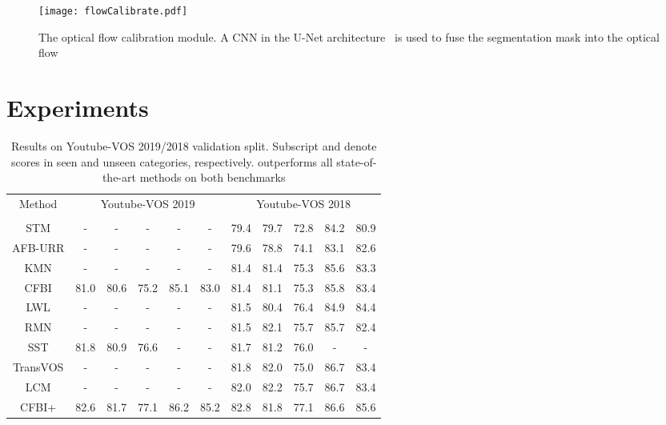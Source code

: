\documentclass[runningheads]{llncs}
\begin{document}
\begin{figure}[tp]
    \centering
    \texttt{[image: flowCalibrate.pdf]}
    \caption{The optical flow calibration module. A CNN in the U-Net architecture~\cite{ronneberger2015u} is used to fuse the segmentation mask into the optical flow}
    \label{fig:flowCalib}
\end{figure}

\section{Experiments}

\setlength{\tabcolsep}{4pt}
\begin{table}[t]
\begin{center}
\caption{Results on Youtube-VOS 2019/2018 validation split. Subscript  and  denote scores in seen and unseen categories, respectively. {\shortname} outperforms all state-of-the-art methods on both benchmarks}
\label{table:youtubevos}
\begin{tabular}{cccccc|ccccc}
\hline
\multirow{2}{4em}{Method} & \multicolumn{5}{c}{Youtube-VOS 2019} & \multicolumn{5}{c}{Youtube-VOS 2018} \\
&  &  &  &  &  &  &  &  &  & \\
\hline
STM\cite{STM} & - & - & - & - & - & 79.4 & 79.7 & 72.8 & 84.2 & 80.9\\
AFB-URR\cite{liang2020video} & - & - & - & - & - & 79.6 & 78.8 & 74.1 & 83.1 & 82.6\\
KMN\cite{seong2020kernelized} & - & - & - & - & - & 81.4 & 81.4 & 75.3 & 85.6 & 83.3\\
CFBI\cite{yang2020collaborative} & 81.0 & 80.6 & 75.2 & 85.1 & 83.0 & 81.4 & 81.1 & 75.3 & 85.8 & 83.4\\
LWL\cite{bhat2020learning} & - & - & - & - & - & 81.5 & 80.4 & 76.4 & 84.9 & 84.4\\
RMN\cite{RMNet} & - & - & - & - & - & 81.5 & 82.1 & 75.7 & 85.7 & 82.4\\
SST\cite{duke2021sstvos} & 81.8 & 80.9 & 76.6 & - & - & 81.7 & 81.2 & 76.0 & - & -\\
TransVOS\cite{TransVOS} & - & - & - & - & - & 81.8 & 82.0 & 75.0 & 86.7 & 83.4\\
LCM\cite{hu2021learning} & - & - & - & - & - & 82.0 & 82.2 & 75.7 & 86.7 & 83.4 \\
CFBI+\cite{yang2021collaborative} & 82.6 & 81.7 & 77.1 & 86.2 & 85.2 & 82.8 & 81.8 & 77.1 & 86.6 & 85.6\\

\end{tabular}
\end{center}
\end{table}
\end{document}
